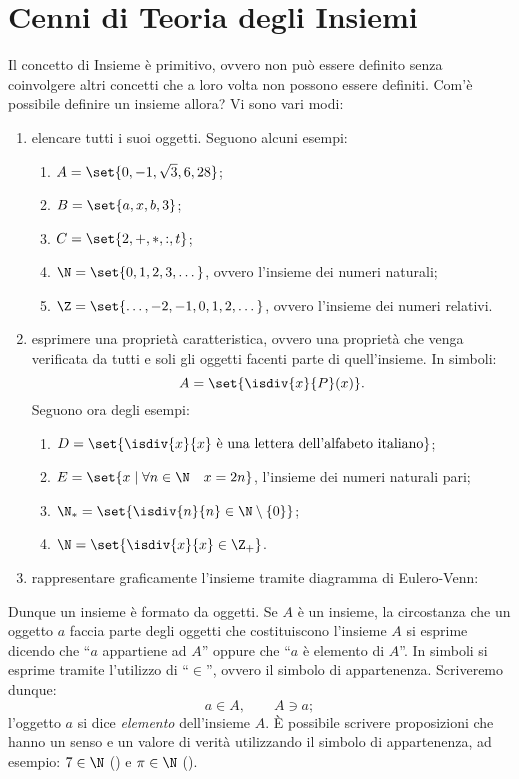 
\chapter{Cenni di Teoria degli Insiemi}\label{chapt:Cenni_Teoria_Insiemi}
Il concetto di Insieme è primitivo, ovvero non può essere definito senza coinvolgere altri concetti che a loro volta non possono essere definiti. Com'è possibile definire un insieme allora? Vi sono vari modi:
\begin{enumerate}
    \item elencare tutti i suoi oggetti. Seguono alcuni esempi:
        \begin{enumerate}[label=\roman*.]
            \item \(A = \set{0, -1, \sqrt{3}, 6, 28}\);
            \item \(B = \set{a, x, b, 3}\);
            \item \(C = \set{2, +, *, :, t}\);
            \item \(\N = \set{0, 1, 2, 3, \dotsc}\), ovvero l'insieme dei numeri naturali;
            \item \(\Z = \set{\dotsc, -2, -1, 0, 1, 2, \dotsc}\), ovvero l'insieme dei numeri relativi.
        \end{enumerate}
    \item esprimere una proprietà caratteristica, ovvero una proprietà che venga verificata da tutti e soli gli oggetti facenti parte di quell'insieme. In simboli:
    \[
        A = \set{\isdiv{x}{P}(x)}.
    \]
    Seguono ora degli esempi:
        \begin{enumerate}[label=\roman*.]
            \item \(D = \set{\isdiv{x}{x} \text{ è una lettera dell'alfabeto italiano}}\);
            \item \(E = \set{x \mid \forall n \in \N \quad x = 2n}\), l'insieme dei numeri naturali pari;
            \item \(\N_* = \set{\isdiv{n}{n} \in \N \setminus \{0}\}\);
            \item \(\N = \set{\isdiv{x}{x} \in \Z_+}\).
        \end{enumerate}
    \item rappresentare graficamente l'insieme tramite diagramma di Eulero-Venn:
    
\end{enumerate}

Dunque un insieme è formato da oggetti. Se \(A\) è un insieme, la circostanza che un oggetto \(a\) faccia parte degli oggetti che costituiscono l'insieme \(A\) si esprime dicendo che ``\(a\) appartiene ad \(A\)'' oppure che ``\(a\) è elemento di \(A\)''. In simboli si esprime tramite l'utilizzo di ``\(\in\)'', ovvero il simbolo di appartenenza. Scriveremo dunque:
\[
    a \in A, \qquad A \ni a;
\]
l'oggetto \(a\) si dice \emph{elemento} dell'insieme \(A\). È possibile scrivere proposizioni che hanno un senso e un valore di verità utilizzando il simbolo di appartenenza, ad esempio: \(7 \in \N\) (\true[l]) e \(\pi \in \N\) (\false[l]).

